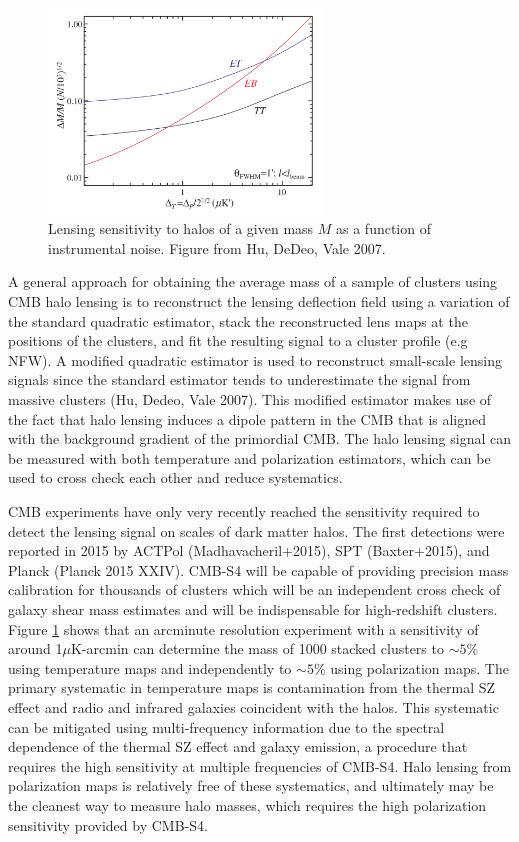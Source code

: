 \begin{figure}[htbp]
\centering 
\includegraphics[width=0.65\textwidth]{CMBLensing/HaloLensing.png}
\caption{Lensing sensitivity to halos of a given mass $M$ as a function of instrumental noise.  Figure from Hu, DeDeo, Vale 2007.}
\label{haloLens}
\end{figure}

A general approach for obtaining the average mass of a sample of clusters using CMB halo lensing is to reconstruct the lensing deflection field using a variation of the standard quadratic estimator, stack the reconstructed lens maps at the positions of the clusters, and fit the resulting signal to a cluster profile (e.g NFW). A modified quadratic estimator is used to reconstruct small-scale lensing signals since the standard estimator tends to underestimate the signal from massive clusters (Hu, Dedeo, Vale 2007).  This modified estimator makes use of the fact that halo lensing induces a dipole pattern in the CMB that is aligned with the background gradient of the primordial CMB.  The halo lensing signal can be measured with both temperature and polarization estimators, which can be used to cross check each other and reduce systematics. 

CMB experiments have only very recently reached the sensitivity required to detect the lensing signal on scales of dark matter halos.  The first detections were reported in 2015 by ACTPol (Madhavacheril+2015), SPT (Baxter+2015), and Planck (Planck 2015 XXIV).  CMB-S4 will be capable of providing precision mass calibration for thousands of clusters which will be an independent cross check of galaxy shear mass estimates and will be indispensable for high-redshift clusters. Figure \ref{haloLens} shows that an arcminute resolution experiment with a sensitivity of around 1$\mu$K-arcmin can determine the mass of 1000 stacked clusters to $\sim 5\%$ using temperature maps and independently to $\sim 5\%$ using polarization maps.
The primary systematic in temperature maps is contamination from the thermal SZ effect and radio and infrared galaxies coincident with the halos. This systematic can be mitigated using multi-frequency information due to the spectral dependence of the thermal SZ effect and galaxy emission, a procedure that
requires the high sensitivity at multiple frequencies of CMB-S4.  
Halo lensing from polarization maps is relatively free of these systematics, and ultimately may be the cleanest way to measure halo masses, which 
requires the high polarization sensitivity provided by CMB-S4. 

